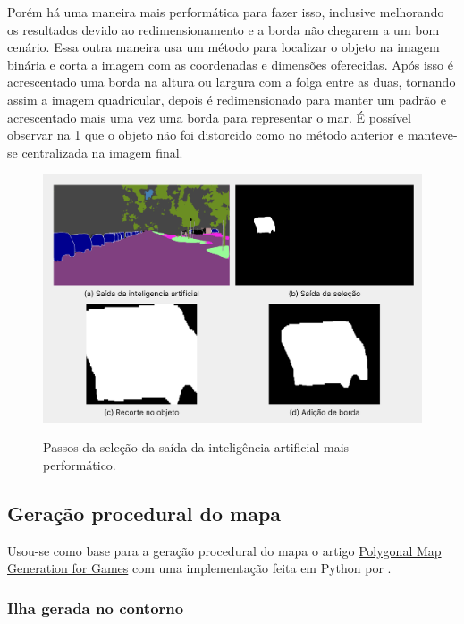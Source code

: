 Porém há uma maneira mais performática para fazer isso, inclusive melhorando os resultados devido ao redimensionamento e a borda não chegarem a um bom cenário. Essa outra maneira usa um método para localizar o objeto na imagem binária e corta a imagem com as coordenadas e dimensões oferecidas. Após isso é acrescentado uma borda na altura ou largura com a folga entre as duas, tornando assim a imagem quadricular, depois é redimensionado para manter um padrão e acrescentado mais uma vez uma borda para representar o mar. É possível observar na \cref{fig:saidas_selecao_perf} que o objeto não foi distorcido como no método anterior e manteve-se centralizada na imagem final.

\begin{figure}[!ht]
	\centering
    \caption{Passos da seleção da saída da inteligência  artificial mais performático.}
	\includegraphics[width=1.0\textwidth]{figures/saidas_selecao_2.png}
	\label{fig:saidas_selecao_perf}
\end{figure}

\subsection{Geração procedural do mapa}

Usou-se como base para a geração procedural do mapa o artigo \hyperref[sec:geracao_procedural_biomas]{Polygonal Map Generation for Games} com uma implementação feita em Python por .

\subsubsection{Ilha gerada no contorno}

